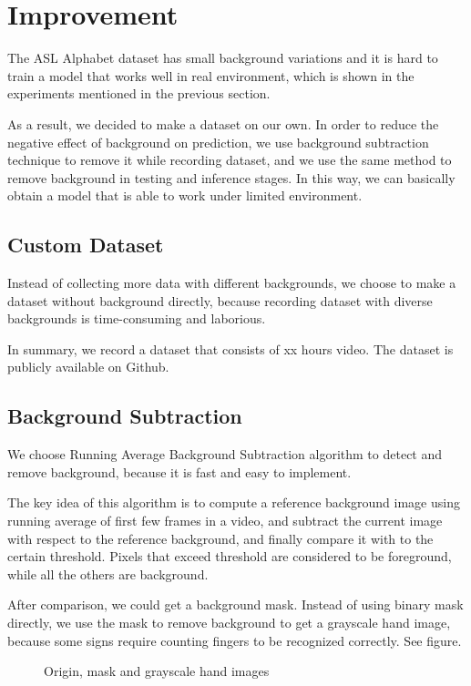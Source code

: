 \documentclass[10pt,twocolumn,letterpaper]{article}
\begin{document}
\section{Improvement}

The ASL Alphabet dataset has small background variations and it is hard to train a model that works well in real environment, which is shown in the experiments mentioned in the previous section.

As a result, we decided to make a dataset on our own. In order to reduce the negative effect of background on prediction, we use background subtraction technique to remove it while recording dataset, and we use the same method to remove background in testing and inference stages. In this way, we can basically obtain a model that is able to work under limited environment.

\subsection{Custom Dataset}

Instead of collecting more data with different backgrounds, we choose to make a dataset without background directly, because recording dataset with diverse backgrounds is time-consuming and laborious.

In summary, we record a dataset that consists of xx hours video. The dataset is publicly available on Github.

\subsection{Background Subtraction}

We choose Running Average Background Subtraction algorithm to detect and remove background, because it is fast and easy to implement.

The key idea of this algorithm is to compute a reference background image using running average of first few frames in a video, and subtract the current image with respect to the reference background, and finally compare it with  to the certain threshold. Pixels that exceed threshold are considered to be foreground, while all the others are background.
 
 After comparison, we could get a background mask. Instead of using binary mask directly, we use the mask to remove background to get a grayscale hand image, because some signs require counting fingers to be recognized correctly. See figure. 
 
 \begin{figure}[h]
\begin{center}
\fbox{\rule{0pt}{2in} \rule{0.9\linewidth}{0pt}}
\end{center}
   \caption{Origin, mask and grayscale hand images}
\label{fig:long}
\label{fig:onecol}
\end{figure}
\end{document}
